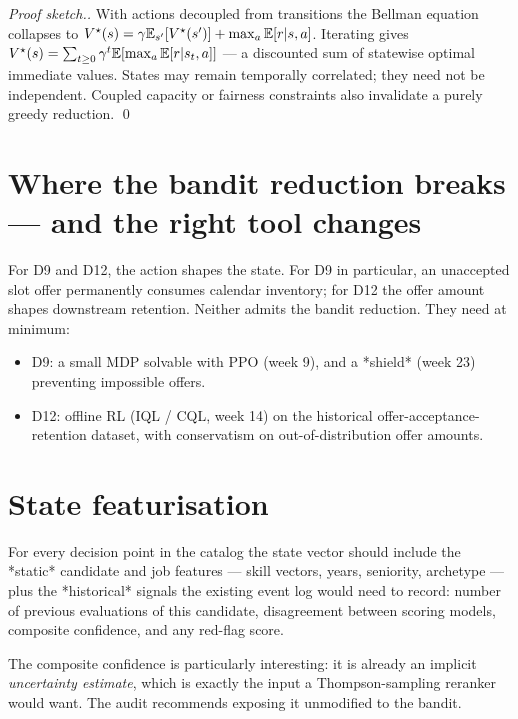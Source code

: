 \documentclass[11pt,oneside]{scrbook}
\begin{document}
\begin{proof}[Proof sketch.]
With actions decoupled from transitions the Bellman equation collapses
to $V^\star(s) = \gamma\mathbb{E}_{s'}[V^\star(s')] + \max_a \mathbb{E}[r|s,a]$. Iterating
gives $V^\star(s) = \sum_{t\ge 0} \gamma^t \mathbb{E}[\max_a \mathbb{E}[r|s_t,a]]$ ---
a discounted sum of statewise optimal immediate values. States may remain temporally correlated; they need not be independent. Coupled capacity or fairness constraints also invalidate a purely greedy reduction. \qed
\end{proof}

\section{Where the bandit reduction breaks --- and the right tool changes}

For D9 and D12, the action shapes the state. For D9 in particular, an
unaccepted slot offer permanently consumes calendar inventory; for D12
the offer amount shapes downstream retention. Neither admits the bandit
reduction. They need at minimum:

\begin{itemize}
  \item D9: a small MDP solvable with PPO (week 9), and a *shield*
        (week 23) preventing impossible offers.
  \item D12: offline RL (IQL / CQL, week 14) on the historical
        offer-acceptance-retention dataset, with conservatism on
        out-of-distribution offer amounts.
\end{itemize}

\section{State featurisation}

For every decision point in the catalog the state vector should include
the *static* candidate and job features --- skill vectors, years,
seniority, archetype --- plus the *historical* signals the existing
event log would need to record: number of previous evaluations of this
candidate, disagreement between scoring models, composite confidence,
and any red-flag score.

The composite confidence is particularly interesting: it is already an
implicit \emph{uncertainty estimate}, which is exactly the input a
Thompson-sampling reranker would want. The audit recommends exposing it
unmodified to the bandit.

\end{document}
